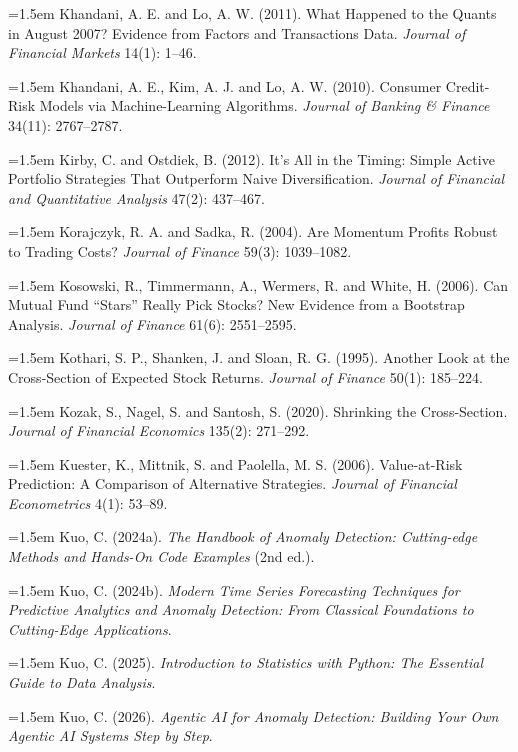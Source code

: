 \hangindent=1.5em Khandani, A. E. and Lo, A. W. (2011). What Happened to the Quants in August 2007? Evidence from Factors and Transactions Data. \emph{Journal of Financial Markets} 14(1): 1--46.

\hangindent=1.5em Khandani, A. E., Kim, A. J. and Lo, A. W. (2010). Consumer Credit-Risk Models via Machine-Learning Algorithms. \emph{Journal of Banking \& Finance} 34(11): 2767--2787.

\hangindent=1.5em Kirby, C. and Ostdiek, B. (2012). It's All in the Timing: Simple Active Portfolio Strategies That Outperform Naive Diversification. \emph{Journal of Financial and Quantitative Analysis} 47(2): 437--467.

\hangindent=1.5em Korajczyk, R. A. and Sadka, R. (2004). Are Momentum Profits Robust to Trading Costs? \emph{Journal of Finance} 59(3): 1039--1082.

\hangindent=1.5em Kosowski, R., Timmermann, A., Wermers, R. and White, H. (2006). Can Mutual Fund ``Stars'' Really Pick Stocks? New Evidence from a Bootstrap Analysis. \emph{Journal of Finance} 61(6): 2551--2595.

\hangindent=1.5em Kothari, S. P., Shanken, J. and Sloan, R. G. (1995). Another Look at the Cross-Section of Expected Stock Returns. \emph{Journal of Finance} 50(1): 185--224.

\hangindent=1.5em Kozak, S., Nagel, S. and Santosh, S. (2020). Shrinking the Cross-Section. \emph{Journal of Financial Economics} 135(2): 271--292.

\hangindent=1.5em Kuester, K., Mittnik, S. and Paolella, M. S. (2006). Value-at-Risk Prediction: A Comparison of Alternative Strategies. \emph{Journal of Financial Econometrics} 4(1): 53--89.

\hangindent=1.5em Kuo, C. (2024a). \emph{The Handbook of Anomaly Detection: Cutting-edge Methods and Hands-On Code Examples} (2nd ed.).

\hangindent=1.5em Kuo, C. (2024b). \emph{Modern Time Series Forecasting Techniques for Predictive Analytics and Anomaly Detection: From Classical Foundations to Cutting-Edge Applications}.

\hangindent=1.5em Kuo, C. (2025). \emph{Introduction to Statistics with Python: The Essential Guide to Data Analysis}.

\hangindent=1.5em Kuo, C. (2026). \emph{Agentic AI for Anomaly Detection: Building Your Own Agentic AI Systems Step by Step}.

